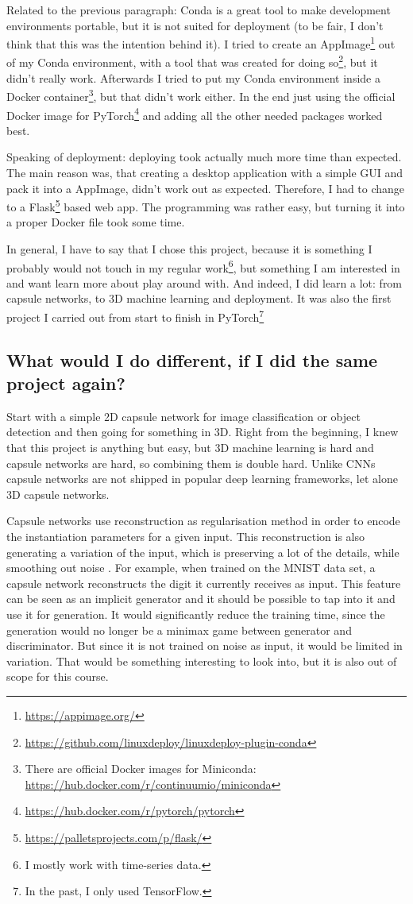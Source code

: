 \documentclass[11pt]{article}
\begin{document}
Related to the previous paragraph: Conda is a great tool to make development environments portable, but it is not suited for deployment (to be fair, I don't think that this was the intention behind it). I tried to create an AppImage\footnote{\url{https://appimage.org/}} out of my Conda environment, with a tool that was created for doing so\footnote{\url{https://github.com/linuxdeploy/linuxdeploy-plugin-conda}}, but it didn't really work. Afterwards I tried to put my Conda environment inside a Docker container\footnote{There are official Docker images for Miniconda: \url{https://hub.docker.com/r/continuumio/miniconda}}, but that didn't work either. In the end just using the official Docker image for PyTorch\footnote{\url{https://hub.docker.com/r/pytorch/pytorch}} and adding all the other needed packages worked best.

Speaking of deployment: deploying took actually much more time than expected. The main reason was, that creating a desktop application with a simple GUI and pack it into a AppImage, didn't work out as expected. Therefore, I had to change to a Flask\footnote{\url{https://palletsprojects.com/p/flask/}} based web app. The programming was rather easy, but turning it into a proper Docker file took some time.

In general, I have to say that I chose this project, because it is something I probably would not touch in my regular work\footnote{I mostly work with time-series data.}, but something I am interested in and want learn more about play around with. And indeed, I did learn a lot: from capsule networks, to 3D machine learning and deployment. It was also the first project I carried out from start to finish in PyTorch\footnote{In the past, I only used TensorFlow.}

\subsection{What would I do different, if I did the same project again?}
Start with a simple 2D capsule network for image classification or object detection and then going for something in 3D. Right from the beginning, I knew that this project is anything but easy, but 3D machine learning is hard and capsule networks are hard, so combining them is double hard. Unlike CNNs capsule networks are not shipped in popular deep learning frameworks, let alone 3D capsule networks.

Capsule networks use reconstruction as regularisation method in order to encode the instantiation parameters for a given input. This reconstruction is also generating a variation of the input, which is preserving a lot of the details, while smoothing out noise \cite{sabour2017}. For example, when trained on the MNIST data set, a capsule network reconstructs the digit it currently receives as input. This feature can be seen as an implicit generator and it should be possible to tap into it and use it for generation. It would significantly reduce the training time, since the generation would no longer be a minimax game between generator and discriminator. But since it is not trained on noise as input, it would be limited in variation. That would be something interesting to look into, but it is also out of scope for this course.
\end{document}
